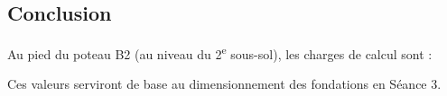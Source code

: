\subsection{Conclusion}

Au pied du poteau B2 (au niveau du 2\textsuperscript{e} sous-sol), les charges de calcul sont :


Ces valeurs serviront de base au dimensionnement des fondations en Séance 3.

